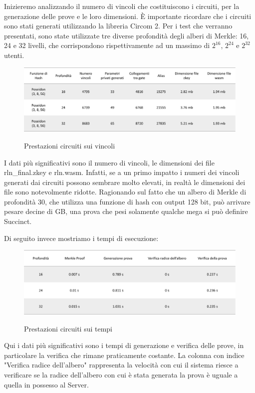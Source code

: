 Inizieremo analizzando il numero di vincoli che costituiscono i circuiti, per la generazione delle prove e le loro
dimensioni. È importante ricordare che i circuiti sono stati generati utilizzando la libreria Circom 2. Per i test che
verranno presentati, sono state utilizzate tre diverse profondità degli alberi di Merkle: 16, 24 e 32 livelli, che
corrispondono rispettivamente ad un massimo di $2^{16}$, $2^{24}$ e $2^{32}$ utenti.
\begin{figure}[H]
    \centering
    \includegraphics[width=15cm]{./chapters/3.poc/images/5.1.bench.png}
    \label{fig:1.bench}
    \captionsetup{justification=centering}
    \caption{Prestazioni circuiti sui vincoli}
\end{figure}
I dati più significativi sono il numero di vincoli, le dimensioni dei file rln\_final.zkey e rln.wasm. Infatti, se a un
primo impatto i numeri dei vincoli generati dai circuiti possono sembrare molto elevati, in realtà le dimensioni dei
file sono notevolmente ridotte. Ragionando sul fatto che un albero di Merkle di profondità 30, che utilizza una
funzione di hash con output 128 bit, può arrivare pesare decine di GB, una prova che pesi solamente qualche mega si può
definire Succinct. 

Di seguito invece mostriamo i tempi di esecuzione:
\begin{figure}[H]
    \centering
    \includegraphics[width=15cm]{./chapters/3.poc/images/5.2.bench.png}
    \label{fig:2.bench}
    \captionsetup{justification=centering}
    \caption{Prestazioni circuiti sui tempi}
\end{figure}

Qui i dati più significativi sono i tempi di generazione e verifica delle prove, in particolare la verifica che rimane
praticamente costante. La colonna con indice "Verifica radice dell'albero" rappresenta la velocità con cui il sistema
riesce a verificare se la radice dell'albero con cui è stata generata la prova è uguale a quella in possesso al Server.